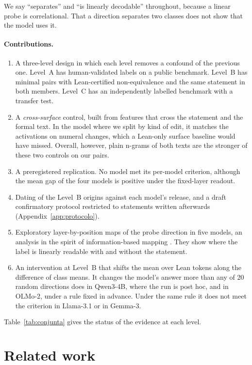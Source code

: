 \documentclass[10pt]{article}
\begin{document}
We say ``separates'' and ``is linearly decodable'' throughout, because a linear probe is correlational. That a
direction separates two classes does not show that the model uses it.

\paragraph{Contributions.}
\begin{enumerate}
\item A three-level design in which each level removes a confound of the previous one. Level~A has human-validated
labels on a public benchmark. Level~B has minimal pairs with Lean-certified non-equivalence and the same statement
in both members. Level~C has an independently labelled benchmark with a transfer test.
\item A \emph{cross-surface} control, built from features that cross the statement and the formal text. In the
model where we split by kind of edit, it matches the activations on numeral changes, which a Lean-only surface
baseline would have missed. Overall, however, plain n-grams of both texts are the stronger of these two controls on our pairs.
\item A preregistered replication. No model met its per-model criterion, although the mean gap of the four models
is positive under the fixed-layer readout.
\item Dating of the Level~B origins against each model's release, and a draft confirmatory protocol restricted to
statements written afterwards (Appendix~\ref{app:protocolo}).
\item Exploratory layer-by-position maps of the probe direction in five models, an analysis in the spirit of
information-based mapping \citep{searchlight}. They show where the label is linearly readable with and without the
statement.
\item An intervention at Level~B that shifts the mean over Lean tokens along the difference of class means. It changes
the model's answer more than any of 20 random directions does in Qwen3-4B, where the run is post hoc, and in OLMo-2, under a rule
fixed in advance. Under the same rule it does not meet the criterion in Llama-3.1 or in Gemma-3.
\end{enumerate}

Table~\ref{tab:conjunta} gives the status of the evidence at each level.

\section{Related work}
\end{document}
